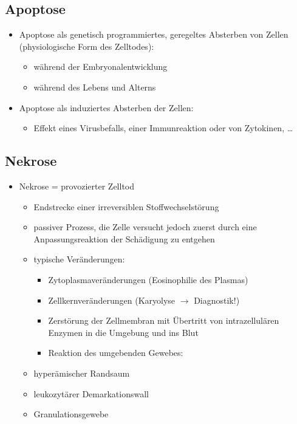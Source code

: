 \subsection{Apoptose}
	\begin{itemize}
		\item Apoptose als genetisch programmiertes, geregeltes Absterben von Zellen (physiologische Form des Zelltodes):
			\begin{itemize}
				\item während der Embryonalentwicklung
				\item während des Lebens und Alterns
			\end{itemize}
		\item Apoptose als induziertes Absterben der Zellen:
			\begin{itemize}
				\item Effekt eines Virusbefalls, einer Immunreaktion oder von Zytokinen, …
			\end{itemize}
	\end{itemize}

\subsection{Nekrose}
	\begin{itemize}
		\item Nekrose = provozierter Zelltod
			\begin{itemize}
				\item Endstrecke einer irreversiblen Stoffwechselstörung
				\item passiver Prozess, die Zelle versucht jedoch zuerst durch eine Anpassungsreaktion der Schädigung zu entgehen
				\item typische Veränderungen:
					\begin{itemize}
						\item Zytoplasmaveränderungen (Eosinophilie des Plasmas)
						\item Zellkernveränderungen (Karyolyse $\rightarrow$ Diagnostik!)
						\item Zerstörung der Zellmembran mit Übertritt von intrazellulären Enzymen in die Umgebung und ins Blut
						\item Reaktion des umgebenden Gewebes:
					\end{itemize}
				\item hyperämischer Randsaum
				\item leukozytärer Demarkationswall
				\item Granulationsgewebe
			\end{itemize}
	\end{itemize}


